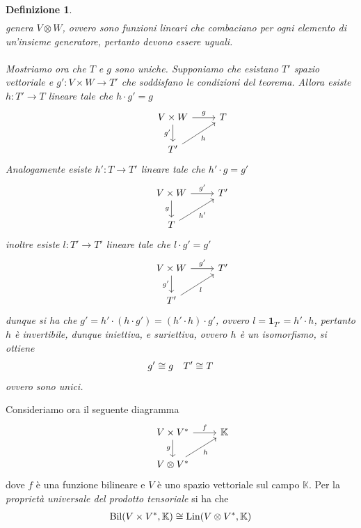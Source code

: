 \documentclass[oneside, 11pt]{amsbook}
\makeatletter
\newcommand{\0}{{(0)}}
\newcommand{\3}{{(3)}}
\theoremstyle{colonplain}
\theoremstyle{colondefinition}
\newtheorem{defn}[thm]{Definizione}
\theoremstyle{colonremark}
\numberwithin{equation}{chapter}
\renewcommand{\proofname}{Dimostrazione}
\renewenvironment{proof}[1][\proofname]{\par
  \pushQED{\qed}%
  \normalfont \topsep6\p@\@plus6\p@\relax
  \trivlist
  \item[\hskip\labelsep\bfseries #1:]\ignorespaces
}{%
  \popQED\endtrivlist\@endpefalse
}
\makeatother
\begin{document}
\begin{defn}
\begin{proof}
\begin{align}
\end{align}
genera $V \otimes W$, ovvero sono funzioni lineari che combaciano per ogni elemento di un'insieme generatore, pertanto devono essere uguali. \\ \\
Mostriamo ora che $T$ e $g$ sono uniche. Supponiamo che esistano $T'$ spazio vettoriale e $g' : V \times W \longrightarrow T'$ che soddisfano le condizioni del teorema. Allora esiste $h : T' \longrightarrow T$ lineare tale che $h \cdot g' = g$ \\
\[
\begin{tikzcd}
&V \times W \arrow[r,"g"] \arrow[d,"g'", swap] & T \\
&T' \arrow[ur, "h", swap] 
\end{tikzcd}
\]
Analogamente esiste $h' : T \longrightarrow T'$ lineare tale che $h' \cdot g = g'$ \\
\[
\begin{tikzcd}
&V \times W \arrow[r,"g'"] \arrow[d,"g", swap] & T' \\
&T \arrow[ur, "h'", swap] 
\end{tikzcd}
\]
inoltre esiste $l : T' \longrightarrow T'$ lineare tale che $l \cdot g' = g'$ \\
\[
\begin{tikzcd}
&V \times W \arrow[r,"g'"] \arrow[d,"g'", swap] & T' \\
&T' \arrow[ur, "l", swap] 
\end{tikzcd}
\]
dunque si ha che $g' = h' \cdot (h \cdot g') = (h' \cdot h) \cdot g'$, ovvero $l = \mathbf{1}_{T'} = h' \cdot h$, pertanto $h$ è invertibile, dunque iniettiva, e suriettiva, ovvero $h$ è un isomorfismo, si ottiene
\begin{align}
    g' \cong g \quad T' \cong T \notag
\end{align}
ovvero sono unici. \end{proof}
\end{defn}
Consideriamo ora il seguente diagramma \\
\[
\begin{tikzcd}
&V \times V^* \arrow[r,"f"] \arrow[d,"g", swap] & \mathbb{K} \\
&V \otimes V^* \arrow[ur, "h", swap] 
\end{tikzcd}
\]
dove $f$ è una funzione bilineare e $V$ è uno spazio vettoriale sul campo $\mathbb{K}$. Per la \textit{proprietà universale del prodotto tensoriale} si ha che
\begin{align}
    \mathrm{Bil}(V \times V^*, \mathbb{K}) \cong \mathrm{Lin}(V \otimes V^*, \mathbb{K}) \notag
\end{align}
\end{document}
